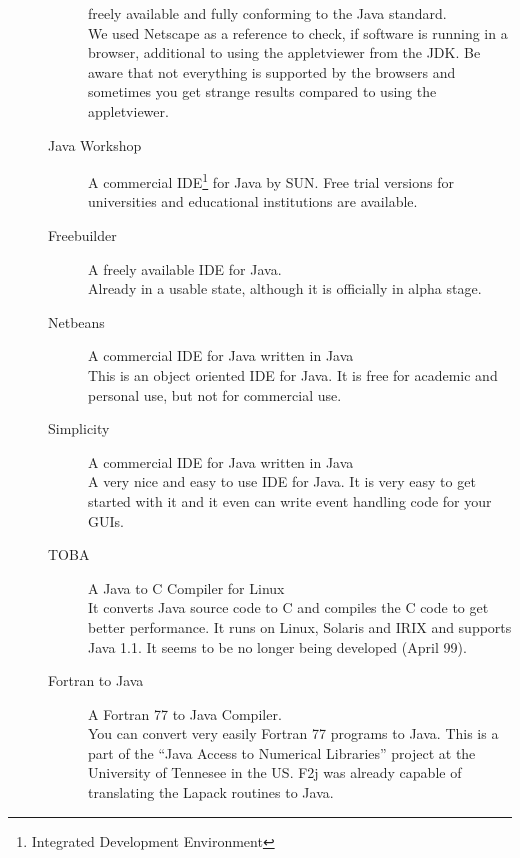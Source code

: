 \begin{description}
\begin{description}
        freely available and fully conforming to the Java standard. \\
        We used Netscape as a reference to check, if software is running
        in a browser, additional to using the appletviewer from the JDK.
        Be aware that not everything is supported by the browsers and
        sometimes you get strange results compared to using the
        appletviewer.       
\item[Java Workshop] A commercial IDE\footnote{Integrated 
    Development Environment} 
  for Java by SUN. Free trial versions
  for universities and educational institutions are available.\\  
\item[Freebuilder] A freely available IDE for Java. \\
  Already in a usable state, although it is officially in alpha stage.
\item[Netbeans] A commercial IDE for Java written in Java \\
  This is an object oriented IDE for Java. It is free for academic and 
  personal use, but not for commercial use.
\item[Simplicity] A commercial IDE for Java written in  Java\\
  A very nice and easy to use IDE for Java. It is very easy to get started
  with it and it even can write event handling code for your GUIs.
\item[TOBA] A Java to C Compiler for Linux\\
  It converts Java source code to C and compiles the C code to get better
  performance. It runs on Linux, Solaris and IRIX and supports Java 1.1.
  It seems to be no longer being developed (April 99).
\item[Fortran to Java] A Fortran 77 to Java Compiler. \\
  You can convert very easily Fortran 77 programs to Java. This is a part of the
  ``Java Access to Numerical Libraries'' project at the University of 
  Tennesee in the US. F2j was already capable of translating the
  Lapack routines to Java.
\end{description}


\end{description}
